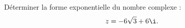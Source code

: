 \medskip

Déterminer la forme exponentielle du nombre complexe :
\[z = -6\sqrt{3} + 6\i.\]

\bigskip

